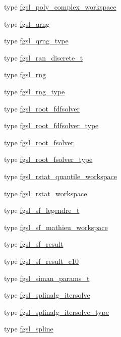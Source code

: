 \begin{DoxyCompactItemize}
type \hyperlink{structfgsl_1_1fgsl__poly__complex__workspace}{fgsl\+\_\+poly\+\_\+complex\+\_\+workspace}
\item 
type \hyperlink{structfgsl_1_1fgsl__qrng}{fgsl\+\_\+qrng}
\item 
type \hyperlink{structfgsl_1_1fgsl__qrng__type}{fgsl\+\_\+qrng\+\_\+type}
\item 
type \hyperlink{structfgsl_1_1fgsl__ran__discrete__t}{fgsl\+\_\+ran\+\_\+discrete\+\_\+t}
\item 
type \hyperlink{structfgsl_1_1fgsl__rng}{fgsl\+\_\+rng}
\item 
type \hyperlink{structfgsl_1_1fgsl__rng__type}{fgsl\+\_\+rng\+\_\+type}
\item 
type \hyperlink{structfgsl_1_1fgsl__root__fdfsolver}{fgsl\+\_\+root\+\_\+fdfsolver}
\item 
type \hyperlink{structfgsl_1_1fgsl__root__fdfsolver__type}{fgsl\+\_\+root\+\_\+fdfsolver\+\_\+type}
\item 
type \hyperlink{structfgsl_1_1fgsl__root__fsolver}{fgsl\+\_\+root\+\_\+fsolver}
\item 
type \hyperlink{structfgsl_1_1fgsl__root__fsolver__type}{fgsl\+\_\+root\+\_\+fsolver\+\_\+type}
\item 
type \hyperlink{structfgsl_1_1fgsl__rstat__quantile__workspace}{fgsl\+\_\+rstat\+\_\+quantile\+\_\+workspace}
\item 
type \hyperlink{structfgsl_1_1fgsl__rstat__workspace}{fgsl\+\_\+rstat\+\_\+workspace}
\item 
type \hyperlink{structfgsl_1_1fgsl__sf__legendre__t}{fgsl\+\_\+sf\+\_\+legendre\+\_\+t}
\item 
type \hyperlink{structfgsl_1_1fgsl__sf__mathieu__workspace}{fgsl\+\_\+sf\+\_\+mathieu\+\_\+workspace}
\item 
type \hyperlink{structfgsl_1_1fgsl__sf__result}{fgsl\+\_\+sf\+\_\+result}
\item 
type \hyperlink{structfgsl_1_1fgsl__sf__result__e10}{fgsl\+\_\+sf\+\_\+result\+\_\+e10}
\item 
type \hyperlink{structfgsl_1_1fgsl__siman__params__t}{fgsl\+\_\+siman\+\_\+params\+\_\+t}
\item 
type \hyperlink{structfgsl_1_1fgsl__splinalg__itersolve}{fgsl\+\_\+splinalg\+\_\+itersolve}
\item 
type \hyperlink{structfgsl_1_1fgsl__splinalg__itersolve__type}{fgsl\+\_\+splinalg\+\_\+itersolve\+\_\+type}
\item 
type \hyperlink{structfgsl_1_1fgsl__spline}{fgsl\+\_\+spline}

\end{DoxyCompactItemize}
